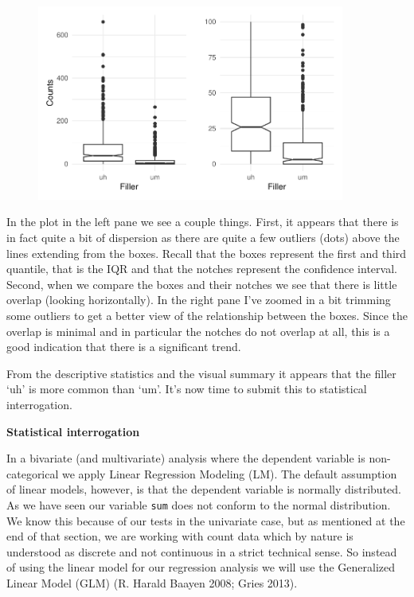 \documentclass[
  letterpaper,
]{latex/krantz}
\begin{document}
\begin{figure}[H]

{\centering \includegraphics[width=0.9\textwidth,height=\textheight]{./inference_files/figure-pdf/i-bi-cont-visual-1.pdf}

}

\end{figure}

In the plot in the left pane we see a couple things. First, it appears
that there is in fact quite a bit of dispersion as there are quite a few
outliers (dots) above the lines extending from the boxes. Recall that
the boxes represent the first and third quantile, that is the IQR and
that the notches represent the confidence interval. Second, when we
compare the boxes and their notches we see that there is little overlap
(looking horizontally). In the right pane I've zoomed in a bit trimming
some outliers to get a better view of the relationship between the
boxes. Since the overlap is minimal and in particular the notches do not
overlap at all, this is a good indication that there is a significant
trend.

From the descriptive statistics and the visual summary it appears that
the filler `uh' is more common than `um'. It's now time to submit this
to statistical interrogation.

\textbf{Statistical interrogation}

In a bivariate (and multivariate) analysis where the dependent variable
is non-categorical we apply Linear Regression Modeling (LM). The default
assumption of linear models, however, is that the dependent variable is
normally distributed. As we have seen our variable \texttt{sum} does not
conform to the normal distribution. We know this because of our tests in
the univariate case, but as mentioned at the end of that section, we are
working with count data which by nature is understood as discrete and
not continuous in a strict technical sense. So instead of using the
linear model for our regression analysis we will use the Generalized
Linear Model (GLM) (R. Harald Baayen 2008; Gries 2013).
\end{document}
